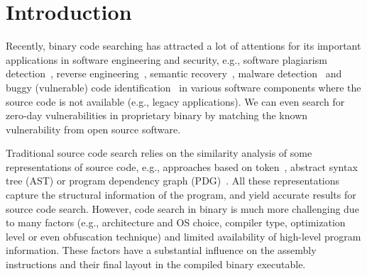 \section{Introduction}\label{sec:info}


Recently, binary code searching has attracted a lot of attentions for its important applications in software engineering and security,
e.g.,  software plagiarism detection~\cite{luo2014semantics}, reverse engineering~\cite{caballero2009binary}, semantic recovery~\cite{kim2014reuse}, malware detection~\cite{ming2015memoized} and buggy (vulnerable) code identification~\cite{DBLP:conf/sp/PewnyGGRH15,DBLP:conf/pldi/DavidY14} in various software components where the source code is not available (e.g., legacy applications).
We can even search for zero-day vulnerabilities in proprietary binary by matching the known vulnerability from open source software.

Traditional source code search relies on the similarity analysis of some representations of source code, e.g., approaches based on token~\cite{DBLP:journals/tse/KamiyaKI02}, abstract syntax tree (AST) \cite{DBLP:conf/icse/JiangMSG07} or program dependency graph (PDG)~\cite{DBLP:conf/icse/GabelJS08}. All these representations capture the structural information of the program, and yield accurate results for source code search. However, code search in binary is much more challenging due to many factors (e.g., architecture and OS choice, compiler type, optimization level or even obfuscation technique) and limited availability of high-level program information. These factors have a substantial influence on the assembly instructions and their final layout in the compiled binary executable.

